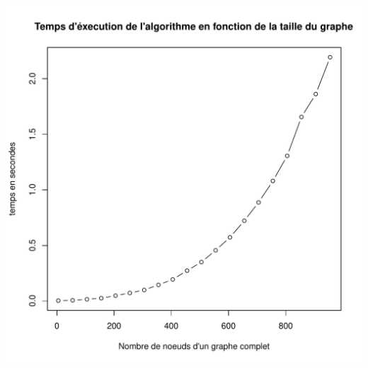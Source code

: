 \documentclass[12pt,a4paper,utf8x]{report}
\begin{document}
\includegraphics[scale=0.7]{img/fleury2.pdf} 
\end{document}
